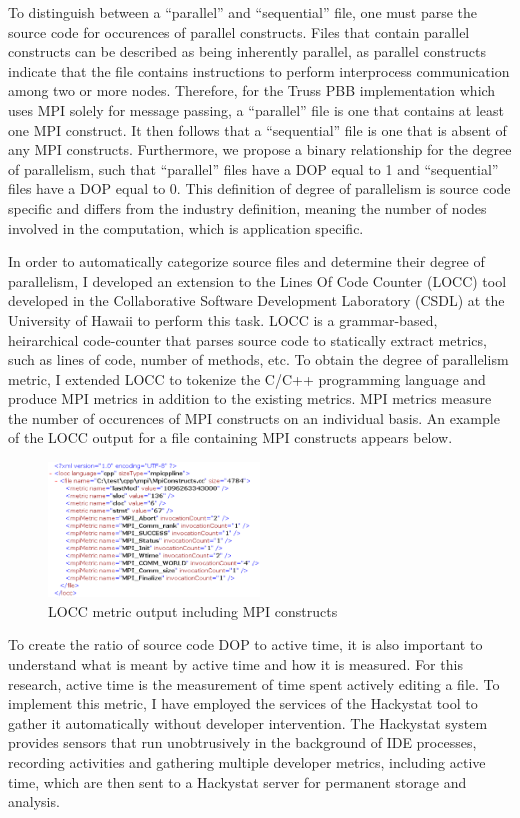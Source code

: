 \documentclass[11pt,twocolumn]{article}
\begin{document}
To distinguish between a ``parallel'' and ``sequential'' file, one
must parse the source code for occurences of parallel constructs.
Files that contain parallel constructs can be described as being
inherently parallel, as parallel constructs indicate that the file
contains instructions to perform interprocess communication among two
or more nodes.  Therefore, for the Truss PBB implementation which uses
MPI solely for message passing, a ``parallel'' file is one that
contains at least one MPI construct.  It then follows that a
``sequential'' file is one that is absent of any MPI constructs.
Furthermore, we propose a binary relationship for the degree of
parallelism, such that ``parallel'' files have a DOP equal to 1 and
``sequential'' files have a DOP equal to 0.  This definition of degree
of parallelism is source code specific and differs from the industry
definition, meaning the number of nodes involved in the computation,
which is application specific.

In order to automatically categorize source files and determine their
degree of parallelism, I developed an extension to the Lines Of Code
Counter (LOCC) tool developed in the Collaborative Software
Development Laboratory (CSDL) at the University of Hawaii to perform
this task.  LOCC is a grammar-based, heirarchical code-counter that
parses source code to statically extract metrics, such as lines of
code, number of methods, etc.  To obtain the degree of parallelism
metric, I extended LOCC to tokenize the C/C++ programming language and
produce MPI metrics in addition to the existing metrics.  MPI metrics
measure the number of occurences of MPI constructs on an individual
basis.  An example of the LOCC output for a file containing MPI
constructs appears below.

\pagebreak
\begin{figure}
  \includegraphics[width=0.5\textwidth]{locc_output.eps}
  \caption{LOCC metric output including MPI constructs}
  \label{fig:LOCCOutput}
\end{figure}

To create the ratio of source code DOP to active time, it is also
important to understand what is meant by active time and how it is
measured.  For this research, active time is the measurement of time
spent actively editing a file.  To implement this metric, I have
employed the services of the Hackystat tool to gather it automatically
without developer intervention.  The Hackystat system provides sensors
that run unobtrusively in the background of IDE processes, recording
activities and gathering multiple developer metrics, including active
time, which are then sent to a Hackystat server for permanent storage
and analysis.
\end{document}
